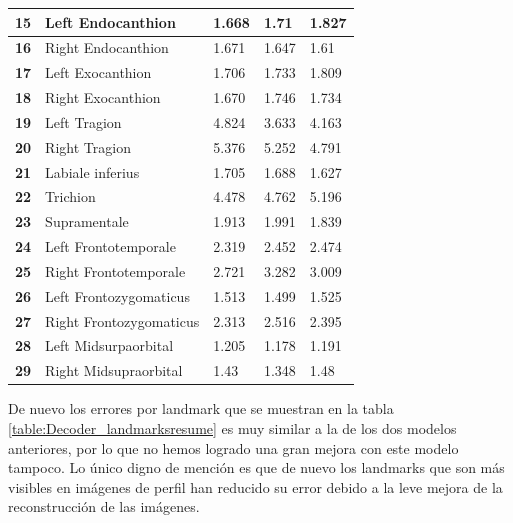 \begin{table}[!ht]
\begin{tabular}{|l|l|l|l|l|}
                \textbf{15} & Left Endocanthion & \cellcolor{green!25} 1.668 & 1.71 & 1.827 \\ \hline
                \textbf{16} & Right Endocanthion & 1.671 & 1.647 & \cellcolor{green!25} 1.61 \\ \hline
                \textbf{17} & Left Exocanthion & \cellcolor{green!25} 1.706 & 1.733 & 1.809 \\ \hline
                \textbf{18} & Right Exocanthion & \cellcolor{green!25} 1.670 & 1.746 & 1.734 \\ \hline
                \textbf{19} & Left Tragion & 4.824 & \cellcolor{green!25} 3.633 & 4.163 \\ \hline
                \textbf{20} & Right Tragion & 5.376 & 5.252 & \cellcolor{green!25} 4.791 \\ \hline
                \textbf{21} & Labiale inferius & 1.705 & 1.688 & \cellcolor{green!25} 1.627 \\ \hline
                \textbf{22} & Trichion & \cellcolor{green!25} 4.478 & 4.762 & 5.196 \\ \hline
                \textbf{23} & Supramentale & 1.913 & 1.991 & \cellcolor{green!25} 1.839 \\ \hline
                \textbf{24} & Left Frontotemporale & \cellcolor{green!25} 2.319 & 2.452 & 2.474 \\ \hline
                \textbf{25} & Right Frontotemporale & \cellcolor{green!25} 2.721 & 3.282 & 3.009 \\ \hline
                \textbf{26} & Left Frontozygomaticus & 1.513 & \cellcolor{green!25} 1.499 & 1.525 \\ \hline
                \textbf{27} & Right Frontozygomaticus & \cellcolor{green!25} 2.313 & 2.516 & 2.395 \\ \hline
                \textbf{28} & Left Midsurpaorbital & 1.205 & \cellcolor{green!25} 1.178 & 1.191 \\ \hline
                \textbf{29} & Right Midsupraorbital & 1.43 & \cellcolor{green!25} 1.348 & 1.48 \\ \hline
            \end{tabular}
            \label{table:Decoder_landmarksresume}
        \end{table}
        \medskip 

        \noindent De nuevo los errores por landmark que se muestran en la tabla \autoref{table:Decoder_landmarksresume} es muy similar a la de los dos modelos anteriores, por lo que no hemos logrado una gran mejora con este modelo tampoco. Lo único digno de mención es que de nuevo los landmarks que son más visibles en imágenes de perfil han reducido su error debido a la leve mejora de la reconstrucción de las imágenes. 

